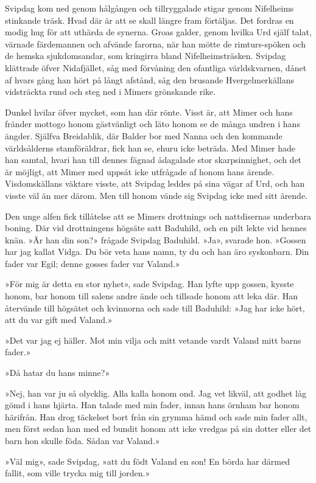 Svipdag kom ned genom hålgången och tillryggalade stigar genom
Nifelheims stinkande träsk. Hvad där är att se skall längre fram
förtäljas. Det fordras en modig hug för att uthärda de synerna. Groas
galder, genom hvilka Urd själf talat, värnade färdemannen och afvände
farorna, när han mötte de rimturs-spöken och de hemska sjukdomsandar,
som kringirra bland Nifelheimsträsken. Svipdag klättrade öfver
Nidafjället, såg med förvåning den ofantliga världskvarnen, dånet af
hvars gång han hört på långt afstånd, såg den brusande Hvergelmerkällans
vidsträckta rund och steg ned i Mimers grönskande rike.

Dunkel hvilar öfver mycket, som han där rönte. Visst är, att Mimer och
hans fränder mottogo honom gästvänligt och läto honom se de många undren
i hans ängder. Själfva Breidablik, där Balder bor med Nanna och den
kommande världsålderns stamföräldrar, fick han se, ehuru icke beträda.
Med Mimer hade han samtal, hvari han till dennes fägnad ådagalade stor
skarpsinnighet, och det är möjligt, att Mimer med uppsåt icke utfrågade
af honom hans ärende. Visdomskällans väktare visste, att Svipdag leddes
på sina vägar af Urd, och han visste väl än mer därom. Men till honom
vände sig Svipdag icke med sitt ärende.

Den unge alfen fick tillåtelse att se Mimers drottnings och nattdisernas
underbara boning. Där vid drottningens högsäte satt Baduhild, och en
pilt lekte vid hennes knän. »Är han din son?» frågade Svipdag Baduhild.
»Ja», svarade
hon. »Gossen har jag kallat Vidga. Du bör veta hans namn, ty du och han
äro syskonbarn. Din fader var Egil; denne gosses fader var Valand.»

»För mig är detta en stor nyhet», sade Svipdag. Han lyfte upp gossen,
kysste honom, bar honom till salens andre ände och tillsade honom att
leka där. Han återvände till högsätet och kvinnorna och sade till
Baduhild: »Jag har icke hört, att du var gift med Valand.»

»Det var jag ej häller. Mot min vilja och mitt vetande vardt Valand mitt
barns fader.»

»Då hatar du hans minne?»

»Nej, han var ju så olycklig. Alla kalla honom ond. Jag vet likväl, att
godhet låg gömd i hans hjärta. Han talade med min fader, innan hans
örnham bar honom härifrån. Han drog täckelset bort från sin grymma hämd
och sade min fader allt, men först sedan han med ed bundit honom att
icke vredgas på sin dotter eller det barn hon skulle föda. Sådan var
Valand.»

»Väl mig», sade Svipdag, »att du födt Valand en son! En börda har därmed
fallit, som ville trycka mig till jorden.»


